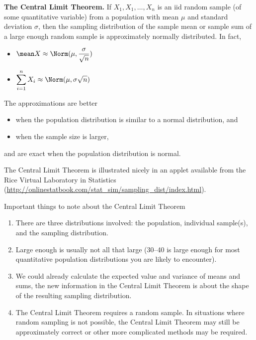\documentclass[twoside]{book}\usepackage[]{graphicx}\usepackage[]{xcolor}
\newlength{\tempfmlength}
\newenvironment{fmpage}[1]
     {
	 \medskip
	 \setlength{\tempfmlength}{#1}
	 \begin{lrbox}{\fmbox}
	   \begin{minipage}{#1}
		 \vspace*{.02\tempfmlength}
		 \hfill
	   \begin{minipage}{.95 \tempfmlength}}
		 {\end{minipage}\hfill
		 \vspace*{.015\tempfmlength}
		 \end{minipage}\end{lrbox}\fbox{\usebox{\fmbox}}
	 \medskip
	 }
\newenvironment{boxedText}[1][.98\textwidth]%
{%
\begin{center}
\begin{fmpage}{#1}
}%
{%
\end{fmpage}
\end{center}
}
\begin{document}
\begin{boxedText}
{\sf \bfseries The Central Limit Theorem.}
If $X_1, X_1, \dots, X_n$ is an iid random sample (of some quantitative variable) 
from a population with mean $\mu$ and standard deviation $\sigma$,
then the sampling distribution of the sample mean or sample sum 
of a large enough random sample is approximately normally distributed.  In fact,
\medskip

\begin{itemize}
\item $\displaystyle \mean X \approx \Norm(\mu, \frac{\sigma}{\sqrt{n}}) $
\item $\displaystyle \sum_{i=1}^{n} X_i \approx \Norm(\mu, {\sigma}{\sqrt{n}}) $
\end{itemize}
\medskip

The approximations are better 
\begin{itemize}
\item
when the population distribution is similar to a normal distribution, and 
\item
when the sample size is larger,
\end{itemize}
and are exact when the population distribution is normal.

\medskip
The Central Limit Theorem is illustrated nicely in an applet available 
from the Rice Virtual Laboratory in Statistics
(\url{http://onlinestatbook.com/stat_sim/sampling_dist/index.html}).
\end{boxedText}

Important things to note about the Central Limit Theorem
\begin{enumerate}
	\item
		There are three distributions involved: the population, individual sample(s),
		and the sampling distribution.
	\item
		Large enough is usually not all that large (30--40 is large enough for 
		most quantitative population distributions you are likely to encounter).
	\item
		We could already calculate the expected value and variance of means
		and sums, the new information in the Central Limit Theorem is about the
		shape of the resulting sampling distribution.
	\item
		The Central Limit Theorem requires a random sample.  In situations where
		random sampling is not possible, the Central Limit Theorem may still be 
		approximately correct or other more complicated methods may be required.
\end{enumerate}
\end{document}

